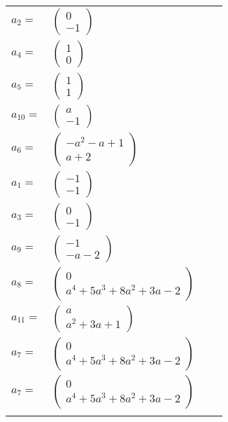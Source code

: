 \documentclass[1p]{elsarticle_modified}
\theoremstyle{definition}
\begin{document}
\begin{tabular}{m{7pt} m{180pt} m{7pt} m{180pt} }
\flushright $a_{2}=$&$\begin{pmatrix}0\\-1\end{pmatrix}$ \\
\flushright $a_{4}=$&$\begin{pmatrix}1\\0\end{pmatrix}$ \\
\flushright $a_{5}=$&$\begin{pmatrix}1\\1\end{pmatrix}$ \\
\flushright $a_{10}=$&$\begin{pmatrix}a\\-1\end{pmatrix}$ \\
\flushright $a_{6}=$&$\begin{pmatrix}- a^2- a+1\\a+2\end{pmatrix}$ \\
\flushright $a_{1}=$&$\begin{pmatrix}-1\\-1\end{pmatrix}$ \\
\flushright $a_{3}=$&$\begin{pmatrix}0\\-1\end{pmatrix}$ \\
\flushright $a_{9}=$&$\begin{pmatrix}-1\\- a-2\end{pmatrix}$ \\
\flushright $a_{8}=$&$\begin{pmatrix}0\\a^4+5 a^3+8 a^2+3 a-2\end{pmatrix}$ \\
\flushright $a_{11}=$&$\begin{pmatrix}a\\a^2+3 a+1\end{pmatrix}$ \\
\flushright $a_{7}=$&$\begin{pmatrix}0\\a^4+5 a^3+8 a^2+3 a-2\end{pmatrix}$\\ \flushright $a_{7}=$&$\begin{pmatrix}0\\a^4+5 a^3+8 a^2+3 a-2\end{pmatrix}$\\&\end{tabular}
\end{document}
